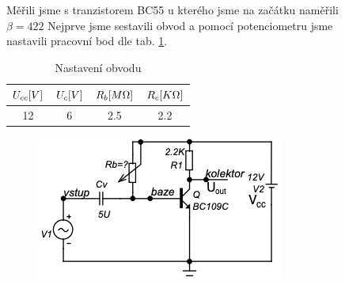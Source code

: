 \documentclass{article}
\newcommand \tab[1]
{ tab. \ref{#1}}
\begin{document}
\begin{figure}[H]
	\begin{minipage}[t]{0.6\textwidth}
    Měřili jsme s tranzistorem BC55 u kterého jsme na začátku naměřili \(\beta = 422\)
    Nejprve jsme sestavili obvod a pomocí potenciometru jsme nastavili pracovní bod dle \tab{tab_pracovni_bod}.
    \vspace{5mm}
    \begin{table}[H]
      \begin{tabular}{|c|c|c|c|} 
        \hline
         \(U_{cc}\-[V]\) & \(U_{c}\-[V]\)  & \(R_b\-[M\Omega]\) &	\(R_c\-[K\Omega]\) \\ \hline
         12              & 6               & 2.5                & 2.2                \\ \hline
      \end{tabular}
      \caption{\label{tab_pracovni_bod} Nastavení obvodu}
    \end{table}
  \end{minipage}
  \hfill
	\begin{minipage}[t]{0.4\textwidth}
    \begin{figure}[H]
      \includegraphics[width=\textwidth]{obvod-z-laborky.png}
      \caption{\label{obvod_z_laborky}}
    \end{figure}
  \end{minipage}
\end{figure}
\end{document}
